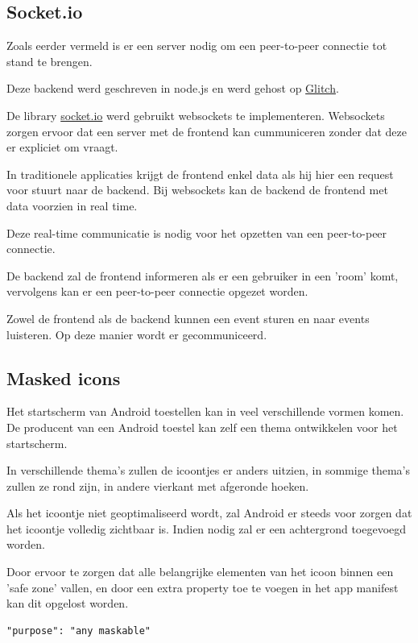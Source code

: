 	\subsection{Socket.io}
	
		Zoals eerder vermeld is er een server nodig om een peer-to-peer connectie tot stand te brengen.
		
		Deze backend werd geschreven in node.js en werd gehost op \href{https://glitch.com/}{Glitch}.
		
		De library \href{https://socket.io/}{socket.io} werd gebruikt websockets te implementeren. Websockets zorgen ervoor dat een server met de frontend kan cummuniceren zonder dat deze er expliciet om vraagt. 
		
		In traditionele applicaties krijgt de frontend enkel data als hij hier een request voor stuurt naar de backend. Bij websockets kan de backend de frontend met data voorzien in real time.
		\autocite{Mozilla2020e}
		
		Deze real-time communicatie is nodig voor het opzetten van een peer-to-peer connectie.
		
		De backend zal de frontend informeren als er een gebruiker in een 'room' komt, vervolgens kan er een peer-to-peer connectie opgezet worden.
		
		Zowel de frontend als de backend kunnen een event sturen en naar events luisteren. Op deze manier wordt er gecommuniceerd. 	
		
			
	\subsection{Masked icons}
	
		Het startscherm van Android toestellen kan in veel verschillende vormen komen. De producent van een Android toestel kan zelf een thema ontwikkelen voor het startscherm.
		
		In verschillende thema's zullen de icoontjes er anders uitzien, in sommige thema's zullen ze rond zijn, in andere vierkant met afgeronde hoeken. 
		
		Als het icoontje niet geoptimaliseerd wordt, zal Android er steeds voor zorgen dat het icoontje volledig zichtbaar is. Indien nodig zal er een achtergrond toegevoegd worden.
		
		Door ervoor te zorgen dat alle belangrijke elementen van het icoon binnen een 'safe zone' vallen, en door een extra property toe te voegen in het app manifest kan dit opgelost worden.
		
\begin{lstlisting}
"purpose": "any maskable" 
\end{lstlisting}

